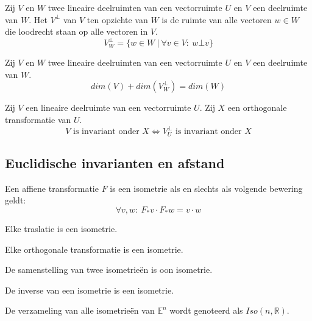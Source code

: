 \documentclass[main.tex]{subfiles}
\begin{document}
\begin{de}
  Zij $V$ en $W$ twee lineaire deelruimten van een vectorruimte $U$ en $V$ een deelruimte van $W$.
  Het  $V^{\bot}$ van $V$ ten opzichte van $W$ is de ruimte van alle vectoren $w\in W$ die loodrecht staan op alle vectoren in $V$.
  \[ V^{\bot}_{W} = \{ w \in W\ |\ \forall v \in V:\ w \bot v \} \]
\end{de}

\begin{st}
  Zij $V$ en $W$ twee lineaire deelruimten van een vectorruimte $U$ en $V$ een deelruimte van $W$.
  \[ dim(V) + dim(V^{\bot}_{W}) = dim(W) \]
\end{st}

\begin{st}
  Zij $V$ een lineaire deelruimte van een vectorruimte $U$.
  Zij $X$ een orthogonale transformatie van $U$.
  \[ V \text{ is invariant onder } X \Leftrightarrow V^{\bot}_{U} \text{ is invariant onder } X \]
\end{st}

\subsection{Euclidische invarianten en afstand}
\label{sec:eucl-invar-en}

\begin{st}
  Een affiene transformatie $F$ is een isometrie als en slechts als volgende bewering geldt:
  \[ \forall v,w:\ F_{*}v \cdot F_{*}w = v \cdot w \]
\end{st}

\begin{st}
  Elke traslatie is een isometrie.
\end{st}

\begin{st}
  Elke orthogonale transformatie is een isometrie.
\end{st}

\begin{st}
  De samenstelling van twee isometrie\"en is oon isometrie.
\end{st}

\begin{st}
  De inverse van een isometrie is een isometrie.
\end{st}

\begin{de}
  De verzameling van alle isometrie\"en van $\mathbb{E}^{n}$ wordt genoteerd als $Iso(n,\mathbb{R})$.
\end{de}
\end{document}
